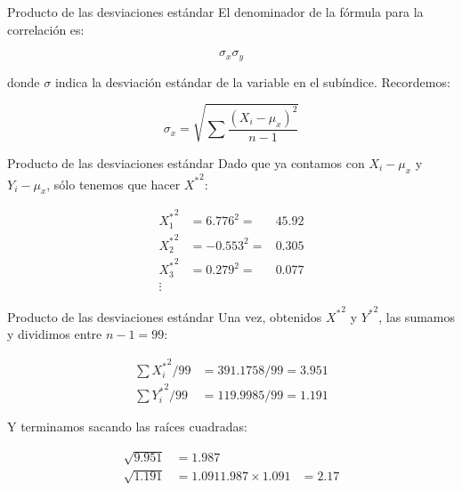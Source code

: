 \documentclass[
  11pt,
  ignorenonframetext,
]{beamer}
\begin{document}
\begin{frame}{Producto de las desviaciones estándar}
\protect\hypertarget{producto-de-las-desviaciones-estuxe1ndar}{}
El denominador de la fórmula para la correlación es:

\begin{equation*}
\sigma_x \sigma_y
\end{equation*}

donde \(\sigma\) indica la desviación estándar de la variable en el
subíndice. Recordemos:

\begin{equation}
\sigma_x = \sqrt{\sum \frac{(X_i - \mu_x)^2}{n-1}}
\end{equation}
\end{frame}

\begin{frame}{Producto de las desviaciones estándar}
\protect\hypertarget{producto-de-las-desviaciones-estuxe1ndar-1}{}
Dado que ya contamos con \(X_i - \mu_x\) y \(Y_i - \mu_x\), sólo tenemos
que hacer \({X^*}^2\):

\begin{align*}
{X^*_1}^2 & = 6.776^2 = & 45.92 \\
{X^*_2}^2 & = -0.553^2 = & 0.305 \\
{X^*_3}^2 & = 0.279^2 = & 0.077 \\
\vdots
\end{align*}
\end{frame}

\begin{frame}{Producto de las desviaciones estándar}
\protect\hypertarget{producto-de-las-desviaciones-estuxe1ndar-2}{}
Una vez, obtenidos \({X^*}^2\) y \({Y^*}^2\), las sumamos y dividimos
entre \(n-1 = 99\):

\begin{align*}
\sum {X^*_i}^2/99 & = 391.1758/99 = 3.951\\
\sum {Y^*_i}^2/99 & = 119.9985/99 = 1.191
\end{align*}

Y terminamos sacando las raíces cuadradas:

\begin{align*}
\sqrt{9.951} & = 1.987\\
\sqrt{1.191} & = 1.091
1.987 \times 1.091 & = 2.17
\end{align*}
\end{frame}
\end{document}
